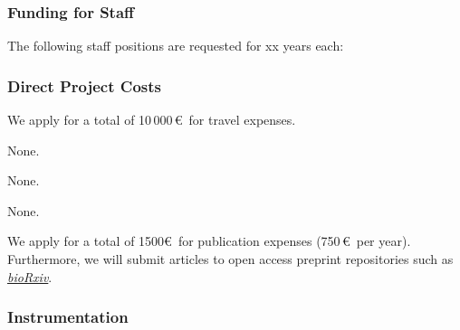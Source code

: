 \documentclass{scrartcl}
\begin{document}
\subsubsection{Funding for Staff}
\begin{funds}
	The following staff positions are requested for xx years each:

\end{funds}


\subsubsection{Direct Project Costs}
\begin{funds}



	We apply for a total of 10\,000\,\euro\ for travel expenses.

	None.

	None.

	None.

	We apply for a total of 1500\euro\ for publication expenses (750\,\euro\ per
	year). Furthermore, we will submit articles to open access preprint repositories
	such as \href{https://www.biorxiv.org/}{\textit{bioRxiv}}.

\end{funds}

\subsubsection{Instrumentation}



\end{document}
